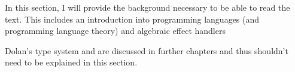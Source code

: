 In this section, I will provide the background necessary to be able to read the text. This includes an introduction into programming languages (and programming language theory) and algebraic effect handlers 

Dolan's type system and \eff are discussed in further chapters and thus shouldn't need to be explained in this section.